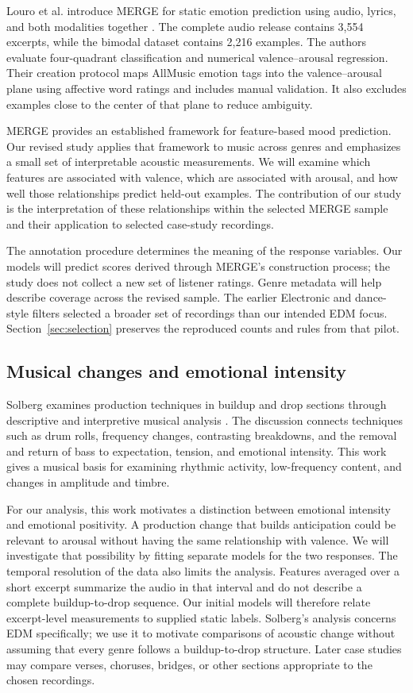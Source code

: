 Louro et al. introduce MERGE for static emotion prediction using audio, lyrics, and both modalities together \cite[Secs.~III--V]{louro2025merge}. The complete audio release contains 3,554 excerpts, while the bimodal dataset contains 2,216 examples. The authors evaluate four-quadrant classification and numerical valence--arousal regression. Their creation protocol maps AllMusic emotion tags into the valence--arousal plane using affective word ratings and includes manual validation. It also excludes examples close to the center of that plane to reduce ambiguity.

MERGE provides an established framework for feature-based mood prediction. Our revised study applies that framework to music across genres and emphasizes a small set of interpretable acoustic measurements. We will examine which features are associated with valence, which are associated with arousal, and how well those relationships predict held-out examples. The contribution of our study is the interpretation of these relationships within the selected MERGE sample and their application to selected case-study recordings.

The annotation procedure determines the meaning of the response variables. Our models will predict scores derived through MERGE's construction process; the study does not collect a new set of listener ratings. Genre metadata will help describe coverage across the revised sample. The earlier Electronic and dance-style filters selected a broader set of recordings than our intended EDM focus. Section~\ref{sec:selection} preserves the reproduced counts and rules from that pilot.

\subsection{Musical changes and emotional intensity}

Solberg examines production techniques in buildup and drop sections through descriptive and interpretive musical analysis \cite{solberg2014bass}. The discussion connects techniques such as drum rolls, frequency changes, contrasting breakdowns, and the removal and return of bass to expectation, tension, and emotional intensity. This work gives a musical basis for examining rhythmic activity, low-frequency content, and changes in amplitude and timbre.

For our analysis, this work motivates a distinction between emotional intensity and emotional positivity. A production change that builds anticipation could be relevant to arousal without having the same relationship with valence. We will investigate that possibility by fitting separate models for the two responses. The temporal resolution of the data also limits the analysis. Features averaged over a short excerpt summarize the audio in that interval and do not describe a complete buildup-to-drop sequence. Our initial models will therefore relate excerpt-level measurements to supplied static labels. Solberg's analysis concerns EDM specifically; we use it to motivate comparisons of acoustic change without assuming that every genre follows a buildup-to-drop structure. Later case studies may compare verses, choruses, bridges, or other sections appropriate to the chosen recordings.

